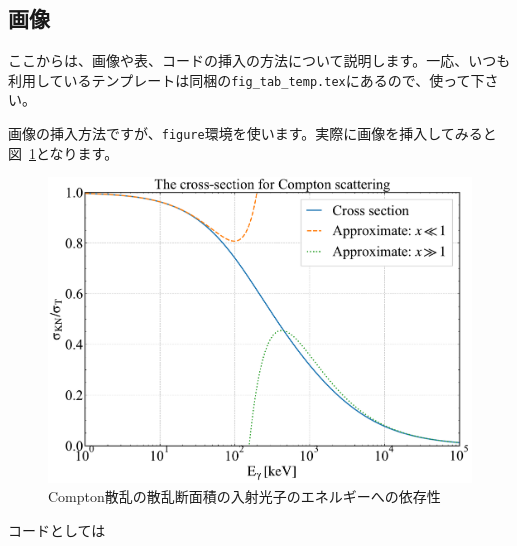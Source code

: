 \documentclass[a4paper,papersize,uplatex,dvipdfmx,10pt]{jsarticle}
\begin{document}
\subsection{画像} %
ここからは、画像や表、コードの挿入の方法について説明します。一応、いつも利用しているテンプレートは同梱の\texttt{fig\_tab\_temp.tex}にあるので、使って下さい。\par
画像の挿入方法ですが、\texttt{figure}環境を使います。実際に画像を挿入してみると図~\ref{fig:co_vs_ci}となります。
\begin{figure}
  \centering %
  \includegraphics[width=0.95\linewidth]{./fig/fig_compton_sc.pdf}
  \caption[Compton散乱の散乱断面積の入射光子のエネルギーへの依存性]{Compton散乱の散乱断面積の入射光子のエネルギーへの依存性}
  \label{fig:co_vs_ci}
\end{figure}
コードとしては
\end{document}
